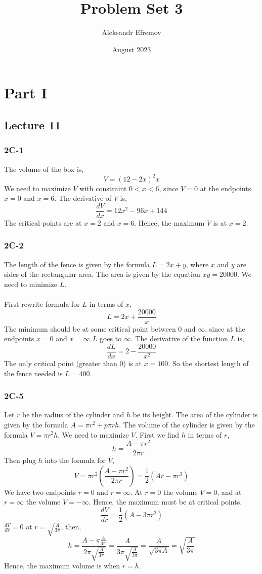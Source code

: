 \documentclass{article}
\title{Problem Set 3}
\author{Aleksandr Efremov}
\date{August 2023}
\begin{document}
\maketitle

\section{Part I}
\subsection{Lecture 11}
\subsubsection{2C-1}
\begin{figure}[htp!]
    \centering
    
    \label{fig:fig1}
\end{figure}
The volume of the box is,
\[ V = (12-2x)^2x \]
We need to maximize $V$ with constraint $0 < x < 6$, since $V = 0$ at the endpoints $x = 0$ and $x = 6$. The derivative of $V$ is,
\[ \frac{dV}{dx} = 12x^2 - 96x + 144 \]
The critical points are at $x = 2$ and $x = 6$. Hence, the maximum $V$ is at $x = 2$.

\subsubsection{2C-2}
The length of the fence is given by the formula $L = 2x + y$, where $x$ and $y$ are sides of the rectangular area. The area is given by the equation $xy = 20000$. We need to minimize $L$. \\ \\
First rewrite formula for $L$ in terms of $x$,
\[ L =  2x + \frac{20000}{x}\]
The minimum should be at some critical point between $0$ and $\infty$, since at the endpoints $x = 0$ and $x = \infty$ $L$ goes to $\infty$. The derivative of the function $L$ is,
\[ \frac{dL}{dx} = 2 - \frac{20000}{x^2} \]
The only critical point (greater than 0) is at $x = 100$. So the shortest length of the fence needed is $L = 400$.

\subsubsection{2C-5}
Let $r$ be the radius of the cylinder and $h$ be its height. The area of the cylinder is given by the formula $A = \pi r^2 + p \pi rh$. The volume of the cylinder is given by the formula $V = \pi r^2 h$. We need to maximize $V$. First we find $h$ in terms of $r$,
\[ h = \frac{A-\pi r^2}{2 \pi r}\]
Then plug $h$ into the formula for $V$,
\[ V = \pi r^2 \left( \frac{A - \pi r^2}{2 \pi r} \right) = \frac{1}{2} \left( Ar - \pi r^3 \right)\]
We have two endpoints $r = 0$ and $r = \infty$. At $r = 0$ the volume $V = 0$, and at $r = \infty$ the volume $V = -\infty$. Hence, the maximum must be at critical points.
\[ \frac{dV}{dr} = \frac{1}{2}\left(A-3\pi r^2 \right) \]
$\frac{dV}{dr} = 0$ at $r = \sqrt{\frac{A}{3\pi}}$, then,
\[ h = \frac{A - \pi \frac{A}{3\pi}}{2\pi\sqrt{\frac{A}{3\pi}}} = \frac{A}{3\pi \sqrt{\frac{A}{3\pi}}} = \frac{A}{\sqrt{3\pi A}} = \sqrt{\frac{A}{3\pi}} \]
Hence, the maximum volume is when $r = h$.
\end{document}
